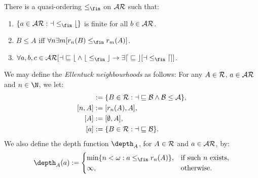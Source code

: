 \documentclass[11pt,reqno]{amsart}
\begin{document}
\begin{axiom}
    There is a quasi-ordering $\leq_\fin$ on $\cal{AR}$ such that:
    \begin{enumerate}[label=(\arabic*)]
        \item $\{a \in \cal{AR} : a \leq_\fin b\}$ is finite for all $b \in \cal{AR}$.

        \item $B \leq A$ iff $\forall n \exists m [r_n(B) \leq_\fin r_m(A)]$.

        \item $\forall a,b,c \in \cal{AR}[a \sqsubseteq b \wedge b \leq_\fin c \to \exists d \sqsubseteq c[a \leq_\fin d]]$.
    \end{enumerate}
\end{axiom}

We may define the \emph{Ellentuck neighbourhoods} as follows: For any $A \in \cal{R}$, $a \in \cal{AR}$ and $n \in \N$, we let:
\begin{align*}
    [a,A] &:= \{B \in \cal{R} : a \sqsubseteq B \wedge B \leq A\}, \\
    [n,A] &:= [r_n(A),A], \\
    [A] &:= [\emptyset,A], \\
    [a] &:= \{B \in \cal{R} : a \sqsubseteq B\}.
\end{align*}
We also define the depth function $\depth_A$, for $A \in \cal{R}$ and $a \in \cal{AR}$, by:
\begin{align*}
    \depth_A(a) := 
    \begin{cases}
        \min\{n < \omega : a \leq_\fin r_n(A)\}, &\text{if such $n$ exists}, \\
        \infty, &\text{otherwise}.
    \end{cases}
\end{align*}
\end{document}
